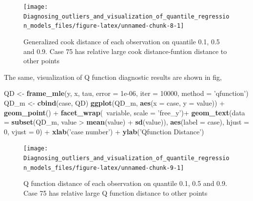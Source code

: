 \documentclass[11pt,a4paper,]{article}
\newenvironment{Shaded}{\begin{snugshade}}{\end{snugshade}}
\newcommand{\KeywordTok}[1]{\textcolor[rgb]{0.13,0.29,0.53}{\textbf{{#1}}}}
\newcommand{\DataTypeTok}[1]{\textcolor[rgb]{0.13,0.29,0.53}{{#1}}}
\newcommand{\DecValTok}[1]{\textcolor[rgb]{0.00,0.00,0.81}{{#1}}}
\newcommand{\FloatTok}[1]{\textcolor[rgb]{0.00,0.00,0.81}{{#1}}}
\newcommand{\StringTok}[1]{\textcolor[rgb]{0.31,0.60,0.02}{{#1}}}
\newcommand{\NormalTok}[1]{{#1}}
\theoremstyle{definition}
\theoremstyle{definition}
\theoremstyle{remark}
\begin{document}
\begin{figure}

{\centering \texttt{[image: Diagnosing\_outliers\_and\_visualization\_of\_quantile\_regression\_models\_files/figure-latex/unnamed-chunk-8-1]} 

}

\caption{Generalized cook distance of each observation on quantile 0.1, 0.5 and 0.9. Case 75 has relative large cook distance-funtion distance to other points}\label{fig:unnamed-chunk-8}
\end{figure}

The same, visualization of Q function diagnostic results are shown in
fig,

\begin{Shaded}
\begin{Highlighting}[]
\NormalTok{QD <-}\StringTok{ }\KeywordTok{frame_mle}\NormalTok{(y, x, tau, }\DataTypeTok{error =} \FloatTok{1e-06}\NormalTok{, }\DataTypeTok{iter =} \DecValTok{10000}\NormalTok{,}
               \DataTypeTok{method =} \StringTok{'qfunction'}\NormalTok{)}
\NormalTok{QD_m <-}\StringTok{ }\KeywordTok{cbind}\NormalTok{(case, QD)}
\KeywordTok{ggplot}\NormalTok{(QD_m, }\KeywordTok{aes}\NormalTok{(}\DataTypeTok{x =} \NormalTok{case, }\DataTypeTok{y =} \NormalTok{value)) +}
\StringTok{ }\KeywordTok{geom_point}\NormalTok{() +}
\StringTok{ }\KeywordTok{facet_wrap}\NormalTok{(~variable, }\DataTypeTok{scale =} \StringTok{'free_y'}\NormalTok{)+}
\StringTok{ }\KeywordTok{geom_text}\NormalTok{(}\DataTypeTok{data =} \KeywordTok{subset}\NormalTok{(QD_m, value >}\StringTok{ }\KeywordTok{mean}\NormalTok{(value) +}\StringTok{ }\KeywordTok{sd}\NormalTok{(value)),}
           \KeywordTok{aes}\NormalTok{(}\DataTypeTok{label =} \NormalTok{case), }\DataTypeTok{hjust =} \DecValTok{0}\NormalTok{, }\DataTypeTok{vjust =} \DecValTok{0}\NormalTok{) +}
\StringTok{ }\KeywordTok{xlab}\NormalTok{(}\StringTok{'case number'}\NormalTok{) +}
\StringTok{ }\KeywordTok{ylab}\NormalTok{(}\StringTok{'Qfunction Distance'}\NormalTok{)}
\end{Highlighting}
\end{Shaded}

\begin{figure}

{\centering \texttt{[image: Diagnosing\_outliers\_and\_visualization\_of\_quantile\_regression\_models\_files/figure-latex/unnamed-chunk-9-1]} 

}

\caption{Q function distance of each observation on quantile 0.1, 0.5 and 0.9. Case 75 has relative large Q function distance to other points}\label{fig:unnamed-chunk-9}
\end{figure}
\end{document}
